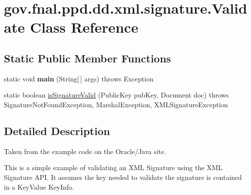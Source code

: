\hypertarget{classgov_1_1fnal_1_1ppd_1_1dd_1_1xml_1_1signature_1_1Validate}{\section{gov.\-fnal.\-ppd.\-dd.\-xml.\-signature.\-Validate Class Reference}
\label{classgov_1_1fnal_1_1ppd_1_1dd_1_1xml_1_1signature_1_1Validate}
}
\subsection*{Static Public Member Functions}
\begin{DoxyCompactItemize}
\item 
\hypertarget{classgov_1_1fnal_1_1ppd_1_1dd_1_1xml_1_1signature_1_1Validate_abaf672a64ab32096e2f296b2543e13ab}{static void {\bfseries main} (String\mbox{[}$\,$\mbox{]} args)  throws Exception }\label{classgov_1_1fnal_1_1ppd_1_1dd_1_1xml_1_1signature_1_1Validate_abaf672a64ab32096e2f296b2543e13ab}

\item 
static boolean \hyperlink{classgov_1_1fnal_1_1ppd_1_1dd_1_1xml_1_1signature_1_1Validate_a91d8142f134c3682379b4acf1b34e6db}{is\-Signature\-Valid} (Public\-Key pub\-Key, Document doc)  throws Signature\-Not\-Found\-Exception, Marshal\-Exception, X\-M\-L\-Signature\-Exception 
\end{DoxyCompactItemize}


\subsection{Detailed Description}
Taken from the example code on the Oracle/\-Java site.

This is a simple example of validating an X\-M\-L Signature using the X\-M\-L Signature A\-P\-I. It assumes the key needed to validate the signature is contained in a Key\-Value Key\-Info. 

